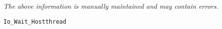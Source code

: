 \label{pkg:io\_wait\_hostthread}

{\tiny \it The above information is manually maintained and may contain errors.}
\begin{verbatim}
Io_Wait_Hostthread
\end{verbatim}
